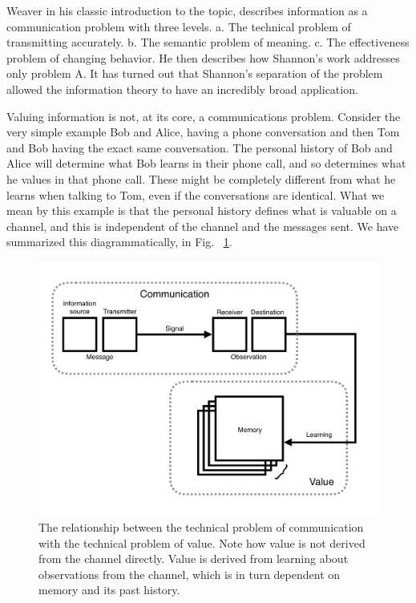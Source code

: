 Weaver \citep{Shannon1948} in his classic introduction to the topic, describes information as a communication problem with three levels. a. The technical problem of transmitting accurately. b. The semantic problem of meaning. c. The effectiveness problem of changing behavior. He then describes how Shannon's work addresses only problem A. It has turned out that Shannon's separation of the problem allowed the information theory to have an incredibly broad application. 

Valuing information is not, at its core, a communications problem. Consider the very simple example Bob and Alice, having a phone conversation and then Tom and Bob having the exact same conversation. The personal history of Bob and Alice will determine what Bob learns in their phone call, and so determines what he values in that phone call. These might be completely different from what he learns when talking to Tom, even if the conversations are identical. What we mean by this example is that the personal history defines what is valuable on a channel, and this is independent of the channel and the messages sent. We have summarized this diagrammatically, in Fig. ~\ref{fig:info1}.

\begin{figure}
\begin{fullwidth}
	\includegraphics[width=1.0\linewidth]{img/info_diagram.pdf} 
    \caption{The relationship between the technical problem of communication with the technical problem of value. Note how value is not derived from the channel directly. Value is derived from learning about observations from the channel, which is in turn dependent on memory and its past history.
    }
    \label{fig:info1} 
\end{fullwidth}
\end{figure}

